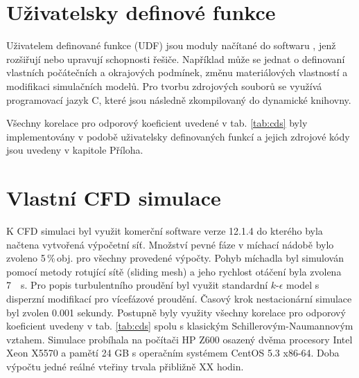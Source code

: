 \section{Uživatelsky definové funkce}
Uživatelem definované funkce (UDF) jsou moduly načítané do softwaru \flu, jenž rozšiřují nebo upravují schopnosti řešiče. Například může se jednat o definovaní vlastních počátečních a okrajových podmínek, změnu materiálových vlastností a modifikaci simulačních modelů. Pro tvorbu zdrojových souborů se využívá programovací jazyk C, které jsou následně zkompilovaný do dynamické knihovny.

Všechny korelace pro odporový koeficient uvedené v tab. \ref{tab:cds} byly implementovány v podobě uživatelsky definovaných funkcí a jejich zdrojové kódy jsou uvedeny v kapitole Příloha.

\section{Vlastní CFD simulace}
K CFD simulaci byl využit komerční software \flu verze 12.1.4 do kterého byla načtena vytvořená výpočetní síť. Množství pevné fáze v míchací nádobě bylo zvoleno 5\,\%\,obj. pro všechny provedené výpočty. Pohyb míchadla byl simulován pomocí metody rotující sítě (sliding mesh) a jeho rychlost otáčení byla zvolena \SI{7}{\per\second}. Pro popis turbulentního proudění byl
využit standardní $k\mbox{-}\epsilon$ model s disperzní modifikací pro vícefázové proudění. Časový krok nestacionární simulace byl zvolen \num{0.001} sekundy. Postupně byly využity všechny korelace pro odporový koeficient uvedeny v tab. \ref{tab:cds} spolu s klasickým Schillerovým-Naumannovým vztahem. Simulace probíhala na počítači HP Z600 osazený dvěma procesory Intel Xeon X5570 a pamětí 24 GB s operačním systémem CentOS 5.3 x86-64. Doba výpočtu jedné reálné vteřiny trvala přibližně XX hodin.


